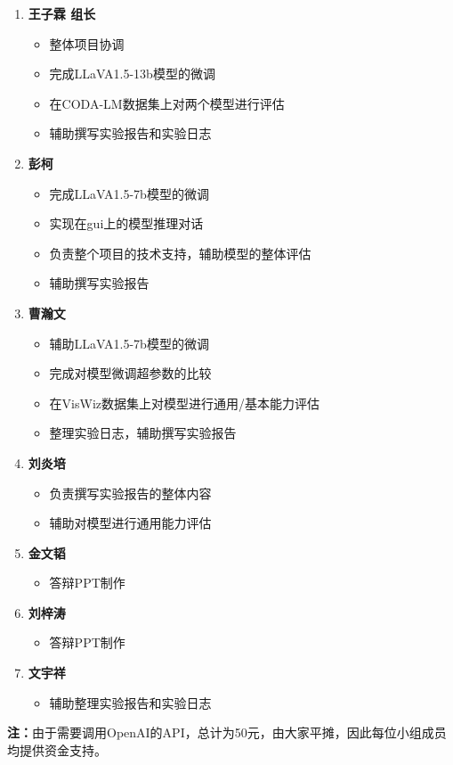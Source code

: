 \documentclass[
    linespread = 1.25
]{ctexart}
\begin{document}
\begin{enumerate}
  \item \textbf{王子霖 \space 组长}
        \begin{itemize}
          \item 整体项目协调
          \item 完成LLaVA1.5-13b模型的微调
          \item 在CODA-LM数据集上对两个模型进行评估
          \item 辅助撰写实验报告和实验日志
        \end{itemize}

  \item \textbf{彭柯}
        \begin{itemize}
          \item 完成LLaVA1.5-7b模型的微调
          \item 实现在gui上的模型推理对话
          \item 负责整个项目的技术支持，辅助模型的整体评估
          \item 辅助撰写实验报告
        \end{itemize}

  \item \textbf{曹瀚文}
        \begin{itemize}
          \item 辅助LLaVA1.5-7b模型的微调
          \item 完成对模型微调超参数的比较
          \item 在VisWiz数据集上对模型进行通用/基本能力评估
          \item 整理实验日志，辅助撰写实验报告
        \end{itemize}

  \item \textbf{刘炎培}
        \begin{itemize}
          \item 负责撰写实验报告的整体内容
          \item 辅助对模型进行通用能力评估
        \end{itemize}

  \item \textbf{金文韬}
        \begin{itemize}
          \item 答辩PPT制作
        \end{itemize}
  \item \textbf{刘梓涛}
        \begin{itemize}
          \item 答辩PPT制作
        \end{itemize}
  \item \textbf{文宇祥}
        \begin{itemize}
          \item 辅助整理实验报告和实验日志
        \end{itemize}

\end{enumerate}
\textbf{注：}由于需要调用OpenAI的API，总计为50元，由大家平摊，因此每位小组成员均提供资金支持。


\end{document}
